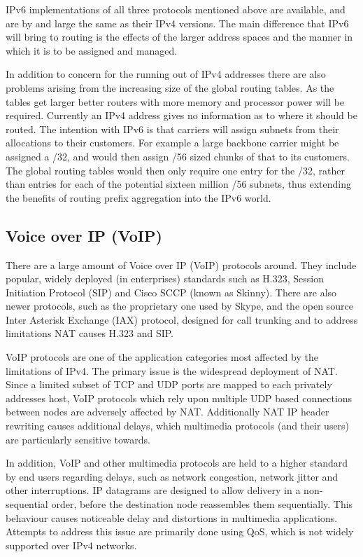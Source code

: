 \documentclass[a4paper,12pt]{article}
\begin{document}
IPv6 implementations of all three protocols mentioned above are available, and
are by and large the same as their IPv4 versions. The main difference that IPv6
will bring to routing is the effects of the larger address spaces and the
manner in which it is to be assigned and managed. 


In addition to concern for the running out of IPv4 addresses there are also
problems arising from the increasing size of the global routing tables. As the
tables get larger better routers with more memory and processor power will be
required. Currently an IPv4 address gives no information as to where it should
be routed. The intention with IPv6 is that carriers will assign subnets from
their allocations to their customers. For example a large backbone carrier
might be assigned a /32, and would then assign /56 sized chunks of that to its
customers. The global routing tables would then only require one entry for the
/32, rather than entries for each of the potential sixteen million /56
subnets, thus extending the benefits of routing prefix aggregation into
the IPv6 world.

\subsection{Voice over IP (VoIP)}

There are a large amount of Voice over IP (VoIP) protocols around. They
include popular, widely deployed (in enterprises) standards such as 
H.323, Session Initiation Protocol (SIP) and Cisco SCCP (known as
Skinny). There are also newer protocols, such as the proprietary one used
by Skype, and the open source Inter Asterisk Exchange (IAX) protocol,
designed for call trunking and to address limitations NAT causes H.323
and SIP.


VoIP protocols are one of the application categories most affected by
the limitations of IPv4. The primary issue is the widespread deployment
of NAT. Since a limited subset of TCP and UDP ports are mapped to each
privately addresses host, VoIP protocols which rely upon multiple UDP
based connections between nodes are adversely affected by NAT.
Additionally NAT IP header rewriting causes additional delays, which 
multimedia protocols (and their users) are particularly sensitive 
towards.


In addition, VoIP and other multimedia protocols are held to a higher
standard by end users regarding delays, such as network congestion, 
network jitter  and other interruptions. IP datagrams are designed to 
allow delivery in a non-sequential order, before the destination node 
reassembles them sequentially. This behaviour causes noticeable delay 
and distortions in multimedia applications. Attempts to address this 
issue are primarily done using QoS, which is not widely supported over 
IPv4 networks.
\end{document}
